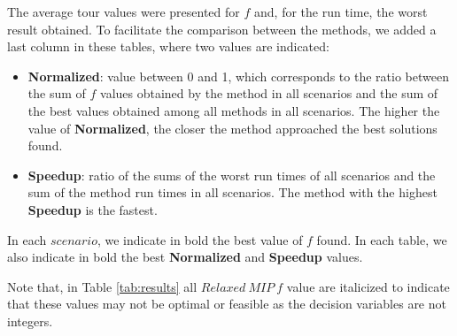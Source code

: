 \documentclass[preprint,authoryear]{elsarticle}
\begin{document}
The average tour values were presented for $f$ and, for the run time, the worst result obtained. To facilitate the comparison between the methods, we added a last column in these tables, where two values are indicated:
\begin{itemize}
	\item {\bf Normalized}: value between 0 and 1, which corresponds to the ratio between the sum of $f$\/ values obtained by the method in all scenarios and the sum of the best values obtained among all methods in all scenarios. The higher the value of {\bf Normalized}, the closer the method approached the best solutions found.
	\item {\bf Speedup}: ratio of the sums of the worst run times of all scenarios and the sum of the method run times in all scenarios. The method with the highest {\bf Speedup}\/ is the fastest.
\end{itemize}

In each $scenario$, we indicate in bold the best value of $f$\/ found. In each table, we also indicate in bold the best {\bf Normalized}\/ and {\bf Speedup}\/ values.

Note that, in Table \ref{tab:results} all $Relaxed\ MIP\ f$ value are italicized to indicate that these values may not be optimal or feasible as the decision variables are not integers.

\vspace{2.0mm}
\end{document}

